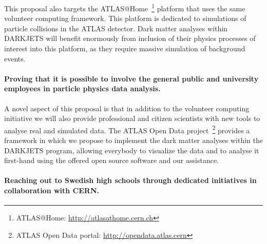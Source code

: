 \documentclass[a4paper,justified]{tufte-handout}
\begin{document}
This proposal also targets the ATLAS@Home~\footnote{ATLAS@Home: \url{http://atlasathome.cern.ch}} platform that uses the same volunteer computing framework. This platform is dedicated to simulations of particle collisions in the ATLAS detector. Dark matter analyses within DARKJETS will benefit enormously from inclusion of their physics processes of interest into this platform, as they require massive simulation of background events. 

\vspace{-10px}
\paragraph{Proving that it is possible to involve the general public and university employees in particle physics data analysis.} %

A novel aspect of this proposal is that in addition to the volunteer computing initiative we will also provide professional and citizen scientists with new tools to analyse real and simulated data. The ATLAS Open Data project~\footnote{ATLAS Open Data portal: \url{http://opendata.atlas.cern}} provides a framework in which we propose to implement the dark matter analyses within the DARKJETS program, allowing everybody to visualize the data and to analyse it first-hand using the offered open source software and our assistance. 

\vspace{-10px}
\paragraph{Reaching out to Swedish high schools through dedicated initiatives in collaboration with CERN.}%
\end{document}
